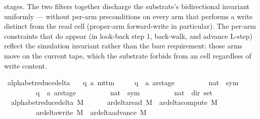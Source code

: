 \begin{isabellebody}
\begin{isamarkuptext}
  stages.  The two  filters together discharge
  the substrate's bidirectional  invariant
  uniformly — without per-arm 
  preconditions on every arm that performs a write distinct from
  the read cell (proper-arm forward-write in particular).  The
  per-arm  constraints that do appear (in
  look-back step 1, back-walk, and advance L-step) reflect the
  simulation invariant rather than the bare 
  requirement: those arms move  on the current tape,
  which the substrate forbids from an  cell
  regardless of write content.%
\end{isamarkuptext}\isamarkuptrue%
\isamarkupfalse%
\ alphabet{\isacharunderscore}{\kern0pt}reduce{\isacharunderscore}{\kern0pt}delta\ {\isacharcolon}{\kern0pt}{\isacharcolon}{\kern0pt}\isanewline
\ \ {\isachardoublequoteopen}{\isacharparenleft}{\kern0pt}{\isacharprime}{\kern0pt}q{\isacharcomma}{\kern0pt}\ {\isacharprime}{\kern0pt}a{\isacharparenright}{\kern0pt}\ mttm\isanewline
\ \ \ \ {\isasymRightarrow}\ {\isacharparenleft}{\kern0pt}{\isacharparenleft}{\kern0pt}{\isacharprime}{\kern0pt}q\ {\isasymtimes}\ {\isacharprime}{\kern0pt}a\ ar{\isacharunderscore}{\kern0pt}stage{\isacharparenright}{\kern0pt}\isanewline
\ \ \ \ \ \ \ \ {\isasymtimes}\ {\isacharparenleft}{\kern0pt}nat\ {\isasymRightarrow}\ sym{}{\isacharparenright}{\kern0pt}\isanewline
\ \ \ \ \ \ \ \ {\isasymtimes}\ {\isacharparenleft}{\kern0pt}{\isacharprime}{\kern0pt}q\ {\isasymtimes}\ {\isacharprime}{\kern0pt}a\ ar{\isacharunderscore}{\kern0pt}stage{\isacharparenright}{\kern0pt}\isanewline
\ \ \ \ \ \ \ \ {\isasymtimes}\ {\isacharparenleft}{\kern0pt}nat\ {\isasymRightarrow}\ sym{}{\isacharparenright}{\kern0pt}\isanewline
\ \ \ \ \ \ \ \ {\isasymtimes}\ {\isacharparenleft}{\kern0pt}nat\ {\isasymRightarrow}\ dir{\isacharparenright}{\kern0pt}{\isacharparenright}{\kern0pt}\ set{\isachardoublequoteclose}\ \isanewline
\ \ {\isachardoublequoteopen}alphabet{\isacharunderscore}{\kern0pt}reduce{\isacharunderscore}{\kern0pt}delta\ M\ {\isacharequal}{\kern0pt}\isanewline
\ \ \ \ \ {\isacharparenleft}{\kern0pt}ar{\isacharunderscore}{\kern0pt}delta{\isacharunderscore}{\kern0pt}read\ M\ {\isasymunion}\ ar{\isacharunderscore}{\kern0pt}delta{\isacharunderscore}{\kern0pt}compute\ M\isanewline
\ \ \ \ \ \ \ \ {\isasymunion}\ ar{\isacharunderscore}{\kern0pt}delta{\isacharunderscore}{\kern0pt}write\ M\ {\isasymunion}\ ar{\isacharunderscore}{\kern0pt}delta{\isacharunderscore}{\kern0pt}advance\ M\isanewline

\end{isabellebody}
